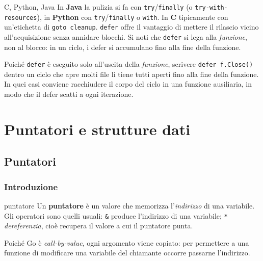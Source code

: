 \documentclass[11pt,a4paper]{report}
\newcommand{\cod}[1]{\texttt{#1}}
\begin{document}
\begin{confronto}{C, Python, Java}
In \textbf{Java} la pulizia si fa con \cod{try}/\cod{finally} (o
\cod{try-with-resources}), in \textbf{Python} con \cod{try}/\cod{finally} o
\cod{with}. In \textbf{C} tipicamente con un'etichetta di \cod{goto cleanup}.
\cod{defer} offre il vantaggio di mettere il rilascio vicino all'acquisizione
senza annidare blocchi. Si noti che \cod{defer} si lega alla \emph{funzione}, non
al blocco: in un ciclo, i defer si accumulano fino alla fine della funzione.
\end{confronto}

\begin{attenzione}
Poiché \cod{defer} è eseguito solo all'uscita della \emph{funzione}, scrivere
\cod{defer f.Close()} dentro un ciclo che apre molti file li tiene tutti aperti
fino alla fine della funzione. In quei casi conviene racchiudere il corpo del
ciclo in una funzione ausiliaria, in modo che il defer scatti a ogni iterazione.
\end{attenzione}

\chapter{Puntatori e strutture dati}\label{ch:dati}

\section{Puntatori}\label{sec:puntatori}

\subsection{Introduzione}

\begin{definizione}{puntatore}
Un \textbf{puntatore} è un valore che memorizza l'\emph{indirizzo} di una
variabile. Gli operatori sono quelli usuali: \cod{\&} produce l'indirizzo di una
variabile; \cod{*} \emph{dereferenzia}, cioè recupera il valore a cui il
puntatore punta.
\end{definizione}

Poiché Go è \emph{call-by-value}, ogni argomento viene copiato: per
permettere a una funzione di modificare una variabile del chiamante occorre
passarne l'indirizzo.
\end{document}
